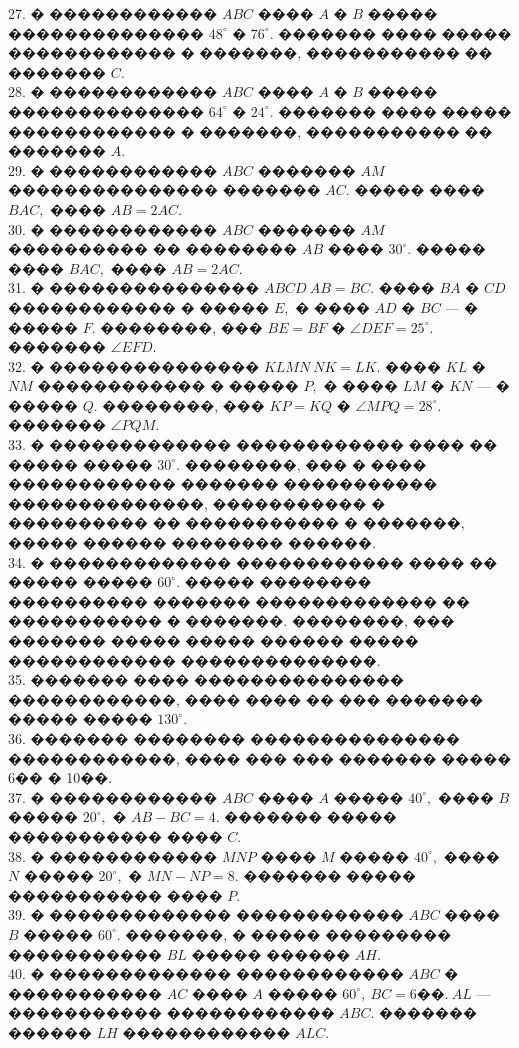 \documentclass[12pt]{article}
\begin{document}
27. � ������������ $ABC$ ���� $A$ � $B$ ����� �������������� $48^\circ$ � $76^\circ.$ ������� ���� ����� ������������ � �������, ����������� �� ������� $C.$\\
28. � ������������ $ABC$ ���� $A$ � $B$ ����� �������������� $64^\circ$ � $24^\circ.$ ������� ���� ����� ������������ � �������, ����������� �� ������� $A.$\\
29. � ������������ $ABC$ ������� $AM$ ��������������� ������� $AC.$ ����� ���� $BAC,$ ���� $AB=2AC.$\\
30. � ������������ $ABC$ ������� $AM$ ���������� �� �������� $AB$ ���� $30^\circ.$ ����� ���� $BAC,$ ���� $AB=2AC.$\\
31. � ��������������� $ABCD\ AB=BC.$ ���� $BA$ � $CD$ ������������ � ����� $E,$ � ���� $AD$ � $BC$ --- � ����� $F.$ ��������, ��� $BE=BF$ � $\angle DEF=25^\circ.$ ������� $\angle EFD.$\\
32. � ��������������� $KLMN\ NK=LK.$ ���� $KL$ � $NM$ ������������ � ����� $P,$ � ���� $LM$ � $KN$ --- � ����� $Q.$ ��������, ��� $KP=KQ$ � $\angle MPQ=28^\circ.$ ������� $\angle PQM.$\\
33. � ������������� ������������ ���� �� ����� ����� $30^\circ.$ ��������, ��� � ���� ������������ ������� ����������� ��������������, ����������� � ���������� �� ����������� � �������, ����� ������ �������� ������.\\
34. � ������������� ������������ ���� �� ����� ����� $60^\circ.$ ����� �������� ���������� ������� ������������� �� ����������� � �������. ��������, ��� ������� ����� ����� ������ ����� ������������ ��������������.\\
35. ������� ���� ��������������� ������������, ���� ���� �� ��� ������� ����� ����� $130^\circ.$\\
36. ������� �������� ��������������� ������������, ���� ��� ��� ������� ����� 6�� � 10��.\\
37. � ������������ $ABC$ ���� $A$ ����� $40^\circ,$ ���� $B$ ����� $20^\circ,$ � $AB-BC=4.$  ������� ����� ����������� ���� $C.$\\
38. � ������������ $MNP$ ���� $M$ ����� $40^\circ,$ ���� $N$ ����� $20^\circ,$ � $MN-NP=8.$  ������� ����� ����������� ���� $P.$\\
39. � ������������� ������������ $ABC$ ���� $B$ ����� $60^\circ.$ �������, � ����� ��������� ����������� $BL$ ����� ������ $AH.$\\
40. � ������������� ������������ $ABC$ � ����������� $AC$ ���� $A$ ����� $60^\circ,\
BC=6\text{��}.\ AL$ --- ����������� ������������ $ABC.$ ������� ������ $LH$ ������������ $ALC.$\\
\end{document}

